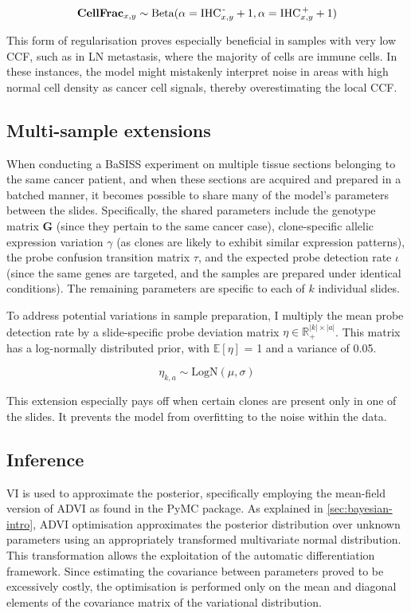 \begin{equation} 
\mathbf{CellFrac}_{x,y} \sim \mathrm{Beta}(\alpha=\text{IHC}^\text{\,-}_{x,y} + 1, \alpha=\text{IHC}^\text{\,+}_{x,y} + 1)
\end{equation}

This form of regularisation proves especially beneficial in samples with very low \acl{CCF}, such as in \acl{LN} metastasis, where the majority of cells are immune cells. In these instances, the model might mistakenly interpret noise in areas with high normal cell density as cancer cell signals, thereby overestimating the local \ac{CCF}.

\subsection{Multi-sample extensions}
When conducting a BaSISS experiment on multiple tissue sections belonging to the same cancer patient, and when these sections are acquired and prepared in a batched manner, it becomes possible to share many of the model's parameters between the slides. Specifically, the shared parameters include the genotype matrix $\mathbf{G}$ (since they pertain to the same cancer case), clone-specific allelic expression variation $\gamma$ (as clones are likely to exhibit similar expression patterns), the probe confusion transition matrix $\tau$, and the expected probe detection rate $\iota$ (since the same genes are targeted, and the samples are prepared under identical conditions). The remaining parameters are specific to each of $k$ individual slides.

To address potential variations in sample preparation, I multiply the mean probe detection rate by a slide-specific probe deviation matrix $\eta \in \mathbb{R}_{+}^{|k|\times|a|}$. This matrix has a log-normally distributed prior, with $\mathbb{E}[{\eta}]$ = 1 and a variance of 0.05.

\begin{equation} 
\eta_{k,a} \sim \text{LogN}(\mu, \sigma)
\end{equation}

This extension especially pays off when certain clones are present only in one of the slides. It prevents the model from overfitting to the noise within the data.

\subsection{Inference}
\label{sec:inference}
\acl{VI} is used to approximate the posterior, specifically employing the mean-field version of \ac{ADVI} as found in the \ac{PyMC} package. As explained in \cref{sec:bayesian-intro}, \ac{ADVI} optimisation approximates the posterior distribution over unknown parameters using an appropriately transformed multivariate normal distribution. This transformation allows the exploitation of the automatic differentiation framework. Since estimating the covariance between parameters proved to be excessively costly, the optimisation is performed only on the mean and diagonal elements of the covariance matrix of the variational distribution.

